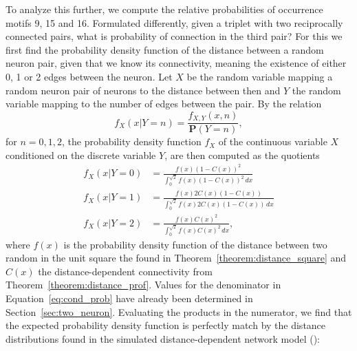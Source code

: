 To analyze this further, we compute the relative probabilities of
occurrence motifs 9, 15 and 16. Formulated differently, given a
triplet with two reciprocally connected pairs, what is probability of
connection in the third pair? For this we first find the probability
density function of the distance between a random neuron pair, given
that we know its connectivity, meaning the existence of either 0, 1 or
2 edges between the neuron. Let $X$ be the random variable mapping a
random neuron pair of neurons to the distance between then and $Y$ the
random variable mapping to the number of edges between the pair. By
the relation
\[
f_X(x \vert Y=n) = \frac{f_{X,Y}(x,n)}{\mathbf{P}(Y=n)},
\]
for $n=0, 1, 2$, the probability density function $f_X$ of the continuous variable
$X$ conditioned on the discrete variable $Y$, are then computed as the
quotients
%
\medskip
\begin{equation}
\begin{aligned}
  f_X(x \vert Y=0)%
    & = \frac{f(x) (1-C(x))^2}%
            {\int_0^{\sqrt{2}} f(x) (1-C(x))^2 \, dx}%
     \\[1em]%
  f_X(x \vert Y=1)%
    & = \frac{f(x) 2 C(x) (1-C(x))}%
             {\int_0^{\sqrt{2}} f(x) 2 C(x) (1-C(x)) \, dx}%
      \\[1em]%
  f_X(x \vert Y=2)%
    & = \frac{f(x) C(x)^2}
             {\int_0^{\sqrt{2}} f(x) C(x)^2 \, dx},
\end{aligned}
\label{eq:cond_prob}
\end{equation}
%
where $f(x)$ is the probability density function of the distance
between two random in the unit square the found in
Theorem~\ref{theorem:distance_square} and $C(x)$ the
distance-dependent connectivity from
Theorem~\ref{theorem:distance_prof}. Values for the denominator in
Equation~\ref{eq:cond_prob} have already been determined in
Section~\ref{sec:two_neuron}. Evaluating the products in the
numerator, we find that the expected probability density function is
perfectly match by the distance distributions found in the simulated
distance-dependent network model ():

